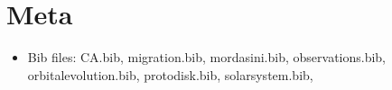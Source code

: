 \chapter{Meta}
\begin{itemize}
    \item Bib files: CA.bib, migration.bib, mordasini.bib, observations.bib, orbitalevolution.bib, protodisk.bib, solarsystem.bib,
\end{itemize}